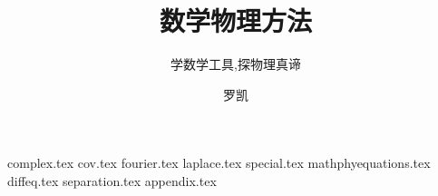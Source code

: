 \documentclass[
  lang=cn,
  10pt,
  mode=simple,
  color=blue, %
  ]{elegantbook}
\title{数学物理方法}
\subtitle{学数学工具,探物理真谛}
\author{罗凯}
\begin{document}
\maketitle
\frontmatter

\tableofcontents

\mainmatter


{complex.tex}
{cov.tex}
{fourier.tex}
{laplace.tex}
{special.tex}
{mathphyequations.tex}
{diffeq.tex}
{separation.tex}
{appendix.tex}



\nocite{*}
\printbibliography[heading=bibintoc, title=\ebibname]
\end{document}
